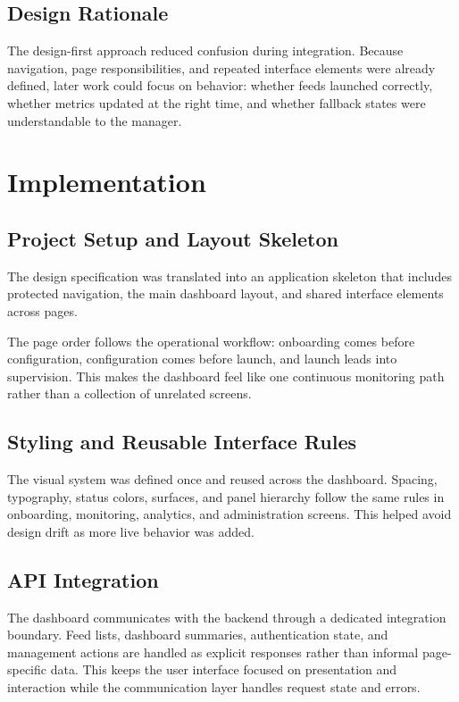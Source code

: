 \subsection{Design Rationale}
The design-first approach reduced confusion during integration. Because navigation, page responsibilities, and repeated interface elements were already defined, later work could focus on behavior: whether feeds launched correctly, whether metrics updated at the right time, and whether fallback states were understandable to the manager.

\section{Implementation}

\subsection{Project Setup and Layout Skeleton}
The design specification was translated into an application skeleton that includes protected navigation, the main dashboard layout, and shared interface elements across pages.

The page order follows the operational workflow: onboarding comes before configuration, configuration comes before launch, and launch leads into supervision. This makes the dashboard feel like one continuous monitoring path rather than a collection of unrelated screens.

\subsection{Styling and Reusable Interface Rules}
The visual system was defined once and reused across the dashboard. Spacing, typography, status colors, surfaces, and panel hierarchy follow the same rules in onboarding, monitoring, analytics, and administration screens. This helped avoid design drift as more live behavior was added.

\subsection{API Integration}
The dashboard communicates with the backend through a dedicated integration boundary. Feed lists, dashboard summaries, authentication state, and management actions are handled as explicit responses rather than informal page-specific data. This keeps the user interface focused on presentation and interaction while the communication layer handles request state and errors.

